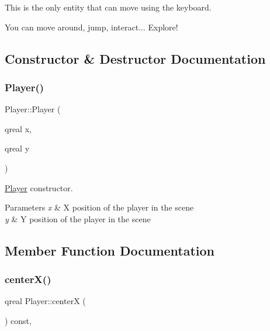 This is the only entity that can move using the keyboard.

You can move around, jump, interact... Explore! 

\subsection{Constructor \& Destructor Documentation}
\mbox{\label{class_player_a623f0a82827dbd74758a90cefe4123d2}} 
\subsubsection{\texorpdfstring{Player()}{Player()}}
{\footnotesize\ttfamily Player\+::\+Player (\begin{DoxyParamCaption}\item[{qreal}]{x,  }\item[{qreal}]{y }\end{DoxyParamCaption})}



\hyperlink{class_player}{Player} constructor. 


\begin{DoxyParams}{Parameters}
{\em x} & X position of the player in the scene \\
\hline
{\em y} & Y position of the player in the scene \\
\hline
\end{DoxyParams}


\subsection{Member Function Documentation}
\mbox{\label{class_player_ac5fcb472ea5e7e2222c13e086ced0aa1}} 
\subsubsection{\texorpdfstring{center\+X()}{centerX()}}
{\footnotesize\ttfamily qreal Player\+::centerX (\begin{DoxyParamCaption}{ }\end{DoxyParamCaption}) const\hspace{0.3cm}{\ttfamily [override]}, {\ttfamily [virtual]}}



